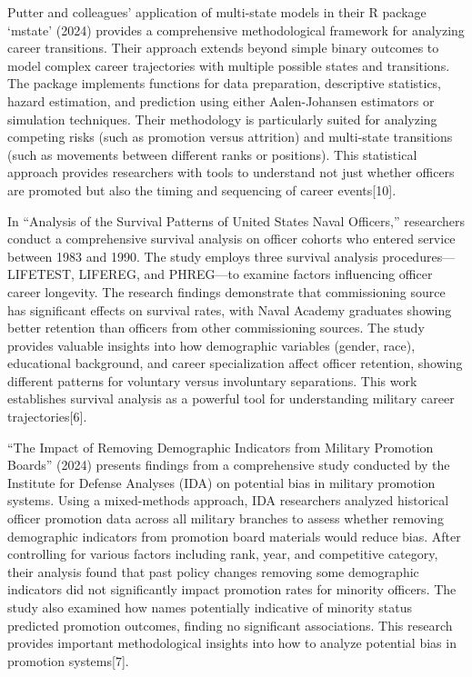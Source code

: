 \documentclass[./main.tex]{subfiles}
\begin{document}
Putter and colleagues' application of multi-state models in their R
package `mstate' (2024) provides a comprehensive methodological
framework for analyzing career transitions. Their approach extends
beyond simple binary outcomes to model complex career trajectories with
multiple possible states and transitions. The package implements
functions for data preparation, descriptive statistics, hazard
estimation, and prediction using either Aalen-Johansen estimators or
simulation techniques. Their methodology is particularly suited for
analyzing competing risks (such as promotion versus attrition) and
multi-state transitions (such as movements between different ranks or
positions). This statistical approach provides researchers with tools to
understand not just whether officers are promoted but also the timing
and sequencing of career events{[}10{]}.

In ``Analysis of the Survival Patterns of United States Naval
Officers,'' researchers conduct a comprehensive survival analysis on
officer cohorts who entered service between 1983 and 1990. The study
employs three survival analysis procedures---LIFETEST, LIFEREG, and
PHREG---to examine factors influencing officer career longevity. The
research findings demonstrate that commissioning source has significant
effects on survival rates, with Naval Academy graduates showing better
retention than officers from other commissioning sources. The study
provides valuable insights into how demographic variables (gender,
race), educational background, and career specialization affect officer
retention, showing different patterns for voluntary versus involuntary
separations. This work establishes survival analysis as a powerful tool
for understanding military career trajectories{[}6{]}.

``The Impact of Removing Demographic Indicators from Military Promotion
Boards'' (2024) presents findings from a comprehensive study conducted
by the Institute for Defense Analyses (IDA) on potential bias in
military promotion systems. Using a mixed-methods approach, IDA
researchers analyzed historical officer promotion data across all
military branches to assess whether removing demographic indicators from
promotion board materials would reduce bias. After controlling for
various factors including rank, year, and competitive category, their
analysis found that past policy changes removing some demographic
indicators did not significantly impact promotion rates for minority
officers. The study also examined how names potentially indicative of
minority status predicted promotion outcomes, finding no significant
associations. This research provides important methodological insights
into how to analyze potential bias in promotion systems{[}7{]}.
\end{document}
